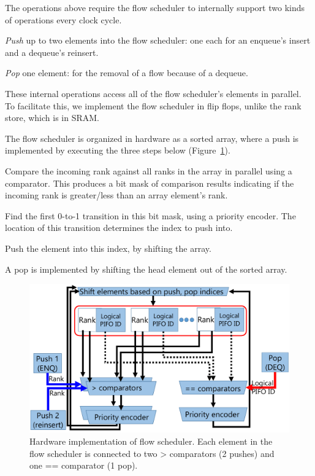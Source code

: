 The operations above require the flow scheduler to internally support two kinds
of operations every clock cycle.
\begin{CompactEnumerate}
\item {\em Push} up to two elements into the flow scheduler: one each for an
  enqueue's insert and a dequeue's reinsert.
\item {\em Pop} one element: for the removal of a flow because of a dequeue.
\end{CompactEnumerate}
These internal operations access all of the flow scheduler's elements in
parallel. To facilitate this, we implement the flow scheduler in flip flops,
unlike the rank store, which is in SRAM.

The flow scheduler is organized in hardware as a sorted array, where a push is
implemented by executing the three steps below
(Figure~\ref{fig:flow_scheduler}).
\begin{CompactEnumerate}
\item Compare the incoming rank against all ranks in the array in parallel using a comparator.
  This produces a bit mask of comparison results indicating if the incoming rank
  is greater/less than an array element's rank.
\item Find the first 0-to-1 transition in this bit mask, using a priority encoder. The location of this transition determines the index to push into.
\item Push the element into this index, by shifting the array.
\end{CompactEnumerate}
A pop is implemented by shifting the head element out of the sorted array.

\begin{figure}[!t]
  \centering
  \includegraphics[width=0.6\columnwidth]{pifo_flow_scheduler_hardware.pdf}
  \caption{Hardware implementation of flow scheduler. Each element in the flow
  scheduler is connected to two > comparators (2 pushes) and one == comparator (1
  pop).}
  \label{fig:flow_scheduler}
\end{figure}

